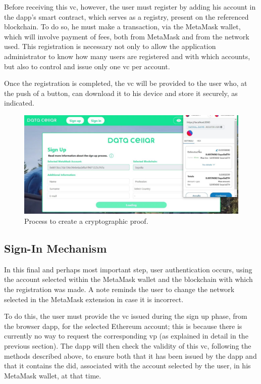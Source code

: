 Before receiving this \gls{vc}, however, the user must register by adding his account in the \gls{dapp}'s smart contract, which serves as a registry, present on the referenced 
blockchain. To do so, he must make a transaction, via the MetaMask wallet, which will involve payment of fees, both from MetaMask and from the network used. This 
registration is necessary not only to allow the application administrator to know how many users are registered and with which accounts, but also to control and issue only 
one \gls{vc} per account.



Once the registration is completed, the \gls{vc} will be provided to the user who, at the push of a button, can download it to his device and store it securely, as indicated.

\begin{figure}[h]  
  \centering
  \includegraphics[width=1\textwidth]{Images/c6_2.jpg} 
  \caption{Process to create a cryptographic proof.}
\end{figure}


\subsection{Sign-In Mechanism}

In this final and perhaps most important step, user authentication occurs, using the account selected within the MetaMask wallet and the blockchain with which the 
registration was made. A note reminds the user to change the network selected in the MetaMask extension in case it is incorrect.

To do this, the user must provide the \gls{vc} issued during the sign up phase, from the browser \gls{dapp}, for the selected Ethereum account; this is because there is 
currently no way to request the corresponding \gls{vp} (as explained in detail in the previous section). The \gls{dapp} will then check the validity of this \gls{vc}, following the 
methods described above, to ensure both that it has been issued by the \gls{dapp} and that it contains the \gls{did}, associated with the account selected by the user, in his 
MetaMask wallet, at that time.

